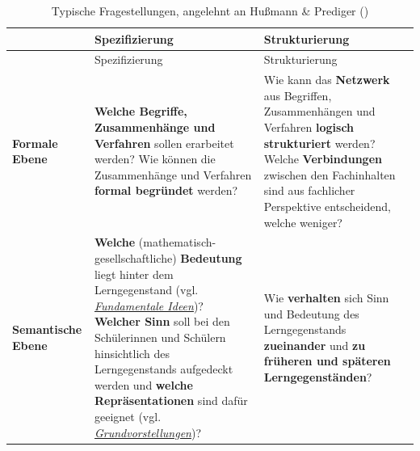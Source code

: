 \documentclass[
]{scrbook}
\theoremstyle{definition}
\theoremstyle{definition}
\theoremstyle{definition}
\theoremstyle{definition}
\theoremstyle{remark}
\begin{document}
\begin{longtable}[]{@{}
  >{\raggedright\arraybackslash}p{}
  >{\raggedright\arraybackslash}p{}
  >{\raggedright\arraybackslash}p{}@{}}
\caption{\label{tab:fragen-ebenen} Typische Fragestellungen, angelehnt an Hußmann \& Prediger ()}\tabularnewline
\toprule\noalign{}
\begin{minipage}[b]{\linewidth}\raggedright
\end{minipage} & \begin{minipage}[b]{\linewidth}\raggedright
Spezifizierung
\end{minipage} & \begin{minipage}[b]{\linewidth}\raggedright
Strukturierung
\end{minipage} \\
\midrule\noalign{}
\endfirsthead
\toprule\noalign{}
\begin{minipage}[b]{\linewidth}\raggedright
\end{minipage} & \begin{minipage}[b]{\linewidth}\raggedright
Spezifizierung
\end{minipage} & \begin{minipage}[b]{\linewidth}\raggedright
Strukturierung
\end{minipage} \\
\midrule\noalign{}
\endhead
\bottomrule\noalign{}
\endlastfoot
\textbf{\textcolor{formalColor}{Formale Ebene}} & \textbf{Welche Begriffe, Zusammenhänge und Verfahren} sollen erarbeitet werden? Wie können die Zusammenhänge und Verfahren \textbf{formal begründet} werden? & Wie kann das \textbf{Netzwerk} aus Begriffen, Zusammenhängen und Verfahren \textbf{logisch strukturiert} werden? Welche \textbf{Verbindungen} zwischen den Fachinhalten sind aus fachlicher Perspektive entscheidend, welche weniger? \\
\textbf{\textcolor{semanticColor}{Semantische Ebene}} & \textbf{Welche} (mathematisch-gesellschaftliche) \textbf{Bedeutung} liegt hinter dem Lerngegenstand (vgl. \hyperref[fundamentale-ideen]{\emph{Fundamentale Ideen}})? \textbf{Welcher Sinn} soll bei den Schülerinnen und Schülern hinsichtlich des Lerngegenstands aufgedeckt werden und \textbf{welche Repräsentationen} sind dafür geeignet (vgl. \hyperref[grundvorstellungen]{\emph{Grundvorstellungen}})? & Wie \textbf{verhalten} sich Sinn und Bedeutung des Lerngegenstands \textbf{zueinander} und \textbf{zu früheren und späteren Lerngegenständen}? \\

\end{longtable}
\end{document}
